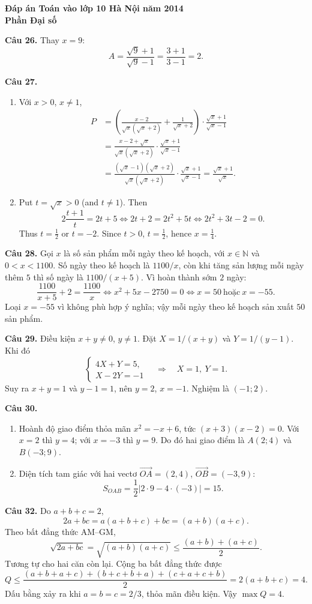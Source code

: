 \documentclass[12pt,a4paper]{article}
\begin{document}
\begin{center}{\Large\bfseries Đáp án Toán vào lớp 10 Hà Nội năm 2014\\Phần Đại số}\end{center}
\textbf{Câu 26.} Thay $x=9$:
\[
A=\frac{\sqrt9+1}{\sqrt9-1}=\frac{3+1}{3-1}=2.
\]

\textbf{Câu 27.}
\begin{enumerate}[label=\alph*)]
\item Với $x>0$, $x\ne1$,
\begin{align*}
P&=\left(\frac{x-2}{\sqrt{x}(\sqrt{x}+2)}+\frac{1}{\sqrt{x}+2}\right)\cdot\frac{\sqrt{x}+1}{\sqrt{x}-1}\\
&=\frac{x-2+\sqrt{x}}{\sqrt{x}(\sqrt{x}+2)}\cdot\frac{\sqrt{x}+1}{\sqrt{x}-1}\\
&=\frac{(\sqrt{x}-1)(\sqrt{x}+2)}{\sqrt{x}(\sqrt{x}+2)}\cdot\frac{\sqrt{x}+1}{\sqrt{x}-1}
=\frac{\sqrt{x}+1}{\sqrt{x}}.
\end{align*}
\item Put $t=\sqrt{x}>0$ (and $t\ne1$). Then
\[
2\frac{t+1}{t}=2t+5
\iff 2t+2=2t^2+5t
\iff 2t^2+3t-2=0.
\]
Thus $t=\frac12$ or $t=-2$. Since $t>0$, $t=\frac12$, hence $x=\frac14$.
\end{enumerate}

\textbf{Câu 28.} Gọi $x$ là số sản phẩm mỗi ngày theo kế hoạch, với $x\in\mathbb N$ và $0<x<1100$. Số ngày theo kế hoạch là $1100/x$, còn khi tăng sản lượng mỗi ngày thêm $5$ thì số ngày là $1100/(x+5)$. Vì hoàn thành sớm $2$ ngày:
\[
\frac{1100}{x+5}+2=\frac{1100}{x}
\iff x^2+5x-2750=0
\iff x=50\ \text{hoặc}\ x=-55.
\]
Loại $x=-55$ vì không phù hợp ý nghĩa; vậy mỗi ngày theo kế hoạch sản xuất $50$ sản phẩm.

\textbf{Câu 29.} Điều kiện $x+y\ne0$, $y\ne1$. Đặt $X=1/(x+y)$ và $Y=1/(y-1)$. Khi đó
\[
\begin{cases}4X+Y=5,\\X-2Y=-1\end{cases}
\quad\Rightarrow\quad X=1,\ Y=1.
\]
Suy ra $x+y=1$ và $y-1=1$, nên $y=2$, $x=-1$. Nghiệm là $(-1;2)$.

\textbf{Câu 30.}
\begin{enumerate}[label=\alph*)]
\item Hoành độ giao điểm thỏa mãn $x^2=-x+6$, tức $(x+3)(x-2)=0$. Với $x=2$ thì $y=4$; với $x=-3$ thì $y=9$. Do đó hai giao điểm là $A(2;4)$ và $B(-3;9)$.
\item Diện tích tam giác với hai vectơ $\overrightarrow{OA}=(2,4)$, $\overrightarrow{OB}=(-3,9)$:
\[
S_{OAB}=\frac12\left|2\cdot9-4\cdot(-3)\right|=15.
\]
\end{enumerate}

\textbf{Câu 32.} Do $a+b+c=2$,
\[
2a+bc=a(a+b+c)+bc=(a+b)(a+c).
\]
Theo bất đẳng thức AM--GM,
\[
\sqrt{2a+bc}=\sqrt{(a+b)(a+c)}\le\frac{(a+b)+(a+c)}2.
\]
Tương tự cho hai căn còn lại. Cộng ba bất đẳng thức được
\[
Q\le\frac{(a+b+a+c)+(b+c+b+a)+(c+a+c+b)}2
=2(a+b+c)=4.
\]
Dấu bằng xảy ra khi $a=b=c=2/3$, thỏa mãn điều kiện. Vậy $\max Q=4$.
\end{document}
